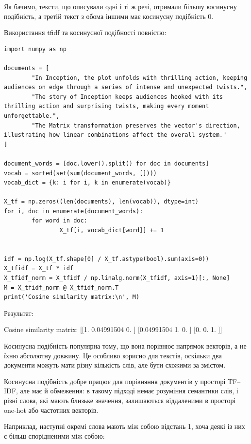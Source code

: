 Як бачимо, тексти, що описували одні і ті ж речі, отримали більшу косинусну подібність, а третій текст з обома іншими має косинусну подібність 0.

Використання tfidf та косинусної подібності повністю:

\begin{lstlisting}
import numpy as np

documents = [
        "In Inception, the plot unfolds with thrilling action, keeping audiences on edge through a series of intense and unexpected twists.",
        "The story of Inception keeps audiences hooked with its thrilling action and surprising twists, making every moment unforgettable.",
        "The Matrix transformation preserves the vector's direction, illustrating how linear combinations affect the overall system."
]

document_words = [doc.lower().split() for doc in documents]
vocab = sorted(set(sum(document_words, [])))
vocab_dict = {k: i for i, k in enumerate(vocab)}

X_tf = np.zeros((len(documents), len(vocab)), dtype=int)
for i, doc in enumerate(document_words):
        for word in doc:
                X_tf[i, vocab_dict[word]] += 1


idf = np.log(X_tf.shape[0] / X_tf.astype(bool).sum(axis=0))
X_tfidf = X_tf * idf
X_tfidf_norm = X_tfidf / np.linalg.norm(X_tfidf, axis=1)[:, None]
M = X_tfidf_norm @ X_tfidf_norm.T
print('Cosine similarity matrix:\n', M)
\end{lstlisting}

Результат:

\begin{console}
Cosine similarity matrix:
 [[1.         0.04991504 0.        ]
 [0.04991504 1.         0.        ]
 [0.         0.         1.        ]]
\end{console}

Косинусна подібність популярна тому, що вона порівнює напрямок векторів, а не їхню абсолютну довжину. Це особливо корисно для текстів, оскільки два документи можуть мати різну кількість слів, але бути схожими за змістом.


 Косинусна подібність добре працює для порівняння документів у просторі TF–IDF, але має й обмеження: в такому підході немає розуміння семантики слів, і різні слова, які мають близьке значення, залишаються віддаленими в просторі one‑hot або частотних векторів.

Наприклад, наступні окремі слова мають між собою відстань 1, хоча деякі із них є більш спорідненими між собою:

